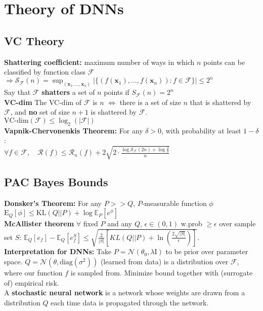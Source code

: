 \section*{Theory of DNNs}
\subsection*{VC Theory}
\textbf{Shattering coefficient: }maximum number of ways in which $n$ points can be classified by function class $\mathcal F$ \\
$\Rightarrow \mathcal S_{\mathcal F}(n)=\sup_{(\mathbf x_1,...,\mathbf x_n)}|\{(f(\mathbf x_1),...,f(\mathbf x_n)): f\in\mathcal F\}|\leq 2^n$\\
Say that $\mathcal F$ \textbf{shatters} a set of $n$ points if $S_\mathcal F(n)=2^n$\\
\textbf{VC-dim} The VC-dim of $\mathcal{F}$ is $n$ $\iff$ there is a set of size $n$ that is shattered by $\mathcal{F}$, and \textbf{no} set of size $n+1$ is shattered by $\mathcal{F}$. \\ $\text{VC-dim}(\mathcal{F}) \leq  \log_2(|\mathcal{F}|)$\\
\textbf{Vapnik-Chervonenkis Theorem:} For any $\delta>0$, with probability at least $1-\delta$:\\
$\forall f\in\mathcal F, \quad \mathcal R(f)\leq\mathcal R_n(f)+2\sqrt{2\cdot\frac{\log\mathcal S_\mathcal F(2n)+\log\frac{2}{\delta}}{n}}$
\subsection*{PAC Bayes Bounds}
\textbf{Donsker's Theorem:} For any $P>>Q$, $P$-measurable function $\phi$ \\ $\mathrm E_Q[\phi]\leq \text{KL}(Q||P)+\log\mathbb E_P[e^\phi]$\\
\textbf{McAllister theorem} $\forall$ fixed $P$ and any $Q$, $\epsilon \in (0,1)$ w.prob $ \geq \epsilon$ over sample set $S$: 
$\mathbb{E}_Q[e_f] - \mathbb{E}_Q[e_f^S] \leq \sqrt{\frac{2}{|S|}\left[KL(Q||P) + \ln\left( \frac{2\sqrt{|S|}}{\epsilon}\right)\right]}$. \\
\textbf{Interpretation for DNNs:} Take $P=\mathcal N(\theta_0,\lambda\mathrm I)$ to be prior over parameter space. $Q=\mathcal N(\theta,\text{diag}(\sigma^2))$ (learned from data) is a distribution over $\mathcal F$, where our function $f$ is sampled from. Minimize bound together with (surrogate of) empirical risk.\\
A \textbf{stochastic neural network} is a network whose weights are drawn from a distribution $Q$ each time data is propagated through the network.